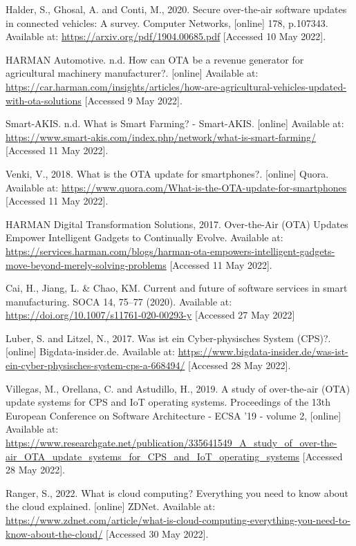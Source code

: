 \documentclass[12pt,a4paper]{article}
\begin{document}
{\begin{thebibliography}{}
Halder, S., Ghosal, A. and Conti, M., 2020. Secure over-the-air software updates in connected vehicles: A survey. Computer Networks, [online] 178, p.107343. Available at: \url{https://arxiv.org/pdf/1904.00685.pdf} [Accessed 10 May 2022].

HARMAN Automotive. n.d. How can OTA be a revenue generator for agricultural machinery manufacturer?. [online] Available at: \url{https://car.harman.com/insights/articles/how-are-agricultural-vehicles-updated-with-ota-solutions} [Accessed 9 May 2022].

Smart-AKIS. n.d. What is Smart Farming? - Smart-AKIS. [online] Available at: \url{https://www.smart-akis.com/index.php/network/what-is-smart-farming/} [Accessed 11 May 2022].

Venki, V., 2018. What is the OTA update for smartphones?. [online] Quora. Available at: \url{https://www.quora.com/What-is-the-OTA-update-for-smartphones} [Accessed 11 May 2022].

HARMAN Digital Transformation Solutions, 2017. Over-the-Air (OTA) Updates Empower Intelligent Gadgets to Continually Evolve. Available at: \url{https://services.harman.com/blogs/harman-ota-empowers-intelligent-gadgets-move-beyond-merely-solving-problems} [Accessed 11 May 2022].

Cai, H., Jiang, L. \& Chao, KM. Current and future of software services in smart manufacturing. SOCA 14, 75–77 (2020). Available at: \url{https://doi.org/10.1007/s11761-020-00293-y} [Accessed 27 May 2022]

Luber, S. and Litzel, N., 2017. Was ist ein Cyber-physisches System (CPS)?. [online] Bigdata-insider.de. Available at: \url{https://www.bigdata-insider.de/was-ist-ein-cyber-physisches-system-cps-a-668494/} [Accessed 28 May 2022].

Villegas, M., Orellana, C. and Astudillo, H., 2019. A study of over-the-air (OTA) update systems for CPS and IoT operating systems. Proceedings of the 13th European Conference on Software Architecture - ECSA '19 - volume 2, [online] Available at: \url{https://www.researchgate.net/publication/335641549_A_study_of_over-the-air_OTA_update_systems_for_CPS_and_IoT_operating_systems} [Accessed 28 May 2022].

Ranger, S., 2022. What is cloud computing? Everything you need to know about the cloud explained. [online] ZDNet. Available at: \url{https://www.zdnet.com/article/what-is-cloud-computing-everything-you-need-to-know-about-the-cloud/} [Accessed 30 May 2022].


\end{thebibliography}}
\end{document}

